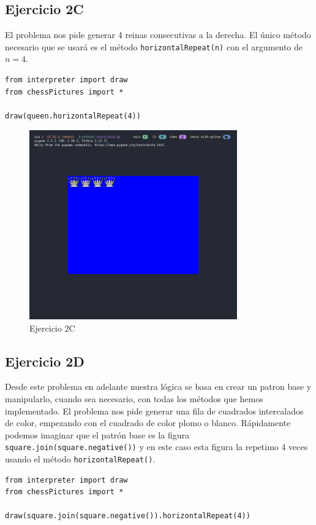 \documentclass[10pt, a4paper]{article}
\newcommand{\mintpython}[1]{\texttt{#1}}
\begin{document}
\subsection{Ejercicio 2C}
El problema nos pide generar 4 reinas consecutivas a la derecha. El único método necesario que se usará es el método \mintpython{horizontalRepeat(n)} con el argumento de $ n = 4 $.

\begin{verbatim}
from interpreter import draw
from chessPictures import *

draw(queen.horizontalRepeat(4))
\end{verbatim}

\begin{figure}[H]
  \centering
  \includegraphics[width=0.8\textwidth]{img/exercise2c.png}
  \caption{Ejercicio 2C}
\end{figure}

\subsection{Ejercicio 2D}
Desde este problema en adelante nuestra lógica se basa en crear un patron base y manipularlo, cuando sea necesario, con todas los métodos que hemos implementado.
\singlespacing
El problema nos pide generar una fila de cuadrados intercalados de color, empezando con el cuadrado de color plomo o blanco. Rápidamente podemos imaginar que el patrón base es la figura \mintpython{square.join(square.negative())} y en este caso esta figura la repetimo 4 veces usando el método \mintpython{horizontalRepeat()}.

\begin{verbatim}
from interpreter import draw
from chessPictures import *

draw(square.join(square.negative()).horizontalRepeat(4))
\end{verbatim}
\end{document}
